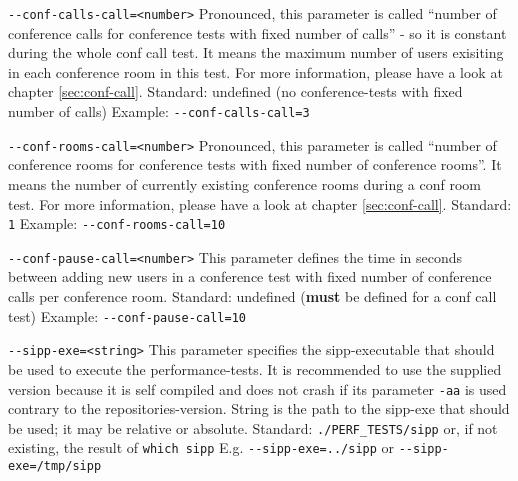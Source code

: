 \begin{description}
\item {\texttt{-{}-conf-calls-call=<number>}} \newline
Pronounced, this parameter is called ``number of conference calls for conference tests with
fixed number of calls'' - so it is constant during the whole conf call test.
It means the maximum number of users exisiting in each conference room in this test.
For more information, please have a look at chapter \ref{sec:conf-call}.
\newline Standard: undefined (no conference-tests with fixed number of calls)
\newline Example: \texttt{-{}-conf-calls-call=3}

\item {\texttt{-{}-conf-rooms-call=<number>}} \newline
Pronounced, this parameter is called ``number of conference rooms for conference tests with
fixed number of conference rooms''. It means the number of currently existing conference rooms
during a conf room test.
For more information, please have a look at chapter \ref{sec:conf-call}.
\newline Standard: \texttt{1} 
\newline Example: \texttt{-{}-conf-rooms-call=10}

\item {\texttt{-{}-conf-pause-call=<number>}} \newline
This parameter defines the time in seconds between adding new users in a conference test
with fixed number of conference calls per conference room. 
\newline Standard: undefined (\textbf{must} be defined for a conf call test)
\newline Example: \texttt{-{}-conf-pause-call=10}

\item {\texttt{-{}-sipp-exe=<string>}} \newline
This parameter specifies the sipp-executable that should be used to execute the performance-tests.
It is recommended to use the supplied version because it is self compiled and does not crash if
its parameter \texttt{-aa} is used contrary to the repositories-version. String is the path to
the sipp-exe that should be used; it may be relative or absolute.
\newline Standard: \texttt{./PERF\_TESTS/sipp} or, if not existing, the result of \texttt{which sipp}
\newline E.g. \texttt{-{}-sipp-exe=../sipp} or \texttt{-{}-sipp-exe=/tmp/sipp}


\end{description}
